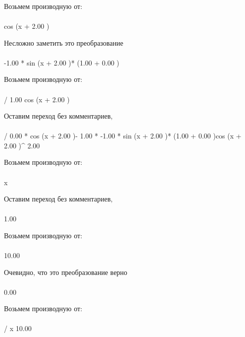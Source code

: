 Возьмем производную от:
\begin{gather}
\end{gather}
\begin{}
cos (x + 2.00 )\\
\end{}
Несложно заметить это преобразование
\begin{gather}
\end{gather}
\begin{}
-1.00 * sin (x + 2.00 )* (1.00 + 0.00 )\\
\end{}
Возьмем производную от:
\begin{gather}
\end{gather}
\begin{}
/ {1.00 }{cos (x + 2.00 )}\\
\end{}
Оставим переход без комментариев, 
\begin{gather}
\end{gather}
\begin{}
/ {0.00 * cos (x + 2.00 )- 1.00 * -1.00 * sin (x + 2.00 )* (1.00 + 0.00 )}{cos (x + 2.00 )^ {2.00 }}\\
\end{}
Возьмем производную от:
\begin{gather}
\end{gather}
\begin{}
x \\
\end{}
Оставим переход без комментариев, 
\begin{gather}
\end{gather}
\begin{}
1.00 \\
\end{}
Возьмем производную от:
\begin{gather}
\end{gather}
\begin{}
10.00 \\
\end{}
Очевидно, что это преобразование верно
\begin{gather}
\end{gather}
\begin{}
0.00 \\
\end{}
Возьмем производную от:
\begin{gather}
\end{gather}
\begin{}
/ {x }{10.00 }\\
\end{}
